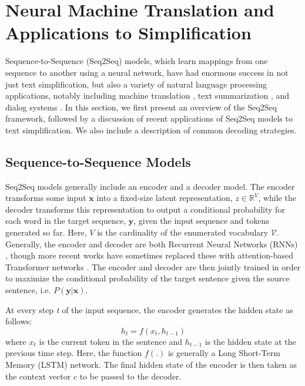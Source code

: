 \documentclass[thesis.tex]{subfiles}
\begin{document}
\section{Neural Machine Translation and Applications to Simplification} \label{sec:neural_review}

Sequence-to-Sequence (Seq2Seq) models, which learn mappings from one sequence to another using a neural network, have had enormous success in not just text simplification, but also a variety of natural language processing applications, notably including machine translation \citep{sutskever2014sequence,luong2015effective,vaswani2017attention}, text summarization \citep{nallapati2016abstractive}, and dialog systems \citep{vinyals2015neural}. In this section, we first present an overview of the Seq2Seq framework, followed by a discussion of recent applications of Seq2Seq models to text simplification. We also include a description of common decoding strategies.

\subsection{Sequence-to-Sequence Models} \label{sec:seq2seq}

Seq2Seq models generally include an encoder and a decoder model. The encoder transforms some input $\textbf{x}$ into a fixed-size latent representation, $z \in \mathbb{R}^V$, while the decoder transforms this representation to output a conditional probability for each word in the target sequence, $\textbf{y}$, given the input sequence and tokens generated so far. Here, $V$ is the cardinality of the enumerated vocabulary $\mathcal{V}$. Generally, the encoder and decoder are both Recurrent Neural Networks (RNNs) \citep{sutskever2014sequence}, though more recent works have sometimes replaced these with attention-based Transformer networks \citep{vaswani2017attention}. The encoder and decoder are then jointly trained in order to maximize the conditional probability of the target sentence given the source sentence, i.e. $P(\textbf{y}|\textbf{x})$.

At every step \textit{t} of the input sequence, the encoder generates the hidden state as follows: 
\begin{equation}
	h_t = f(x_t, h_{t-1})
\end{equation}
where $x_t$ is the current token in the sentence and $h_{t-1}$ is the hidden state at the previous time step. Here, the function $f(.)$ is generally a Long Short-Term Memory (LSTM) network. The final hidden state of the encoder is then taken as the context vector $c$ to be passed to the decoder. 
\end{document}
